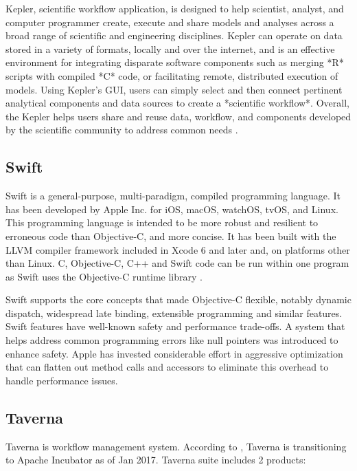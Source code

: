    Kepler, scientific workflow application, is designed to help
   scientist, analyst, and computer programmer create, execute and
   share models and analyses across a broad range of scientific and
   engineering disciplines.  Kepler can operate on data stored in a
   variety of formats, locally and over the internet, and is an
   effective environment for integrating disparate software components
   such as merging *R* scripts with compiled *C* code, or facilitating
   remote, distributed execution of models. Using Kepler's GUI, users
   can simply select and then connect pertinent analytical components
   and data sources to create a *scientific workflow*. Overall, the
   Kepler helps users share and reuse data, workflow, and components
   developed by the scientific community to address common needs
   \cite{www-kepler}.

\subsection{Swift}

   Swift is a general-purpose, multi-paradigm, compiled programming
   language. It has been developed by Apple Inc. for iOS, macOS,
   watchOS, tvOS, and Linux. This programming language is intended to
   be more robust and resilient to erroneous code than Objective-C,
   and more concise. It has been built with the LLVM compiler
   framework included in Xcode 6 and later and, on platforms other
   than Linux. C, Objective-C, C++ and Swift code can be run within
   one program as Swift uses the Objective-C runtime
   library \cite{www-swift-wikipedia}.

   Swift supports the core concepts that made Objective-C flexible,
   notably dynamic dispatch, widespread late binding, extensible
   programming and similar features. Swift features have well-known
   safety and performance trade-offs. A system that helps address
   common programming errors like null pointers was introduced to
   enhance safety. Apple has invested considerable effort in
   aggressive optimization that can flatten out method calls and
   accessors to eliminate this overhead to handle performance issues.
      
\subsection{Taverna}

   Taverna is workflow management system. According to
   \cite{www-taverna}, Taverna is transitioning to Apache Incubator
   as of Jan 2017.  Taverna suite includes 2 products:

